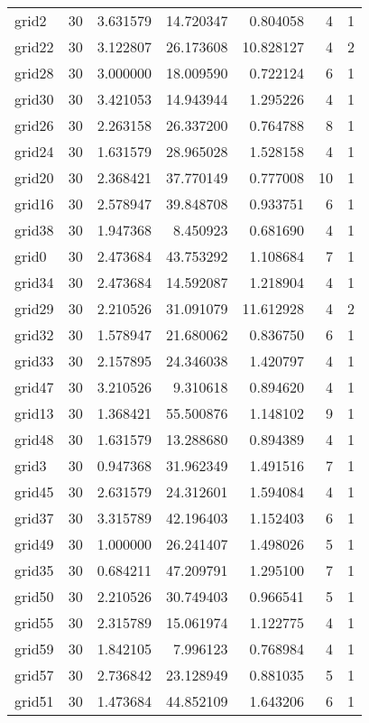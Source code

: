 \begin{longtable}{|l|r|r|r|r|r|r|}
grid2 & 30 & 3.631579 & 14.720347 & 0.804058 & 4 & 1 \\
grid22 & 30 & 3.122807 & 26.173608 & 10.828127 & 4 & 2 \\
grid28 & 30 & 3.000000 & 18.009590 & 0.722124 & 6 & 1 \\
grid30 & 30 & 3.421053 & 14.943944 & 1.295226 & 4 & 1 \\
grid26 & 30 & 2.263158 & 26.337200 & 0.764788 & 8 & 1 \\
grid24 & 30 & 1.631579 & 28.965028 & 1.528158 & 4 & 1 \\
grid20 & 30 & 2.368421 & 37.770149 & 0.777008 & 10 & 1 \\
grid16 & 30 & 2.578947 & 39.848708 & 0.933751 & 6 & 1 \\
grid38 & 30 & 1.947368 & 8.450923 & 0.681690 & 4 & 1 \\
grid0 & 30 & 2.473684 & 43.753292 & 1.108684 & 7 & 1 \\
grid34 & 30 & 2.473684 & 14.592087 & 1.218904 & 4 & 1 \\
grid29 & 30 & 2.210526 & 31.091079 & 11.612928 & 4 & 2 \\
grid32 & 30 & 1.578947 & 21.680062 & 0.836750 & 6 & 1 \\
grid33 & 30 & 2.157895 & 24.346038 & 1.420797 & 4 & 1 \\
grid47 & 30 & 3.210526 & 9.310618 & 0.894620 & 4 & 1 \\
grid13 & 30 & 1.368421 & 55.500876 & 1.148102 & 9 & 1 \\
grid48 & 30 & 1.631579 & 13.288680 & 0.894389 & 4 & 1 \\
grid3 & 30 & 0.947368 & 31.962349 & 1.491516 & 7 & 1 \\
grid45 & 30 & 2.631579 & 24.312601 & 1.594084 & 4 & 1 \\
grid37 & 30 & 3.315789 & 42.196403 & 1.152403 & 6 & 1 \\
grid49 & 30 & 1.000000 & 26.241407 & 1.498026 & 5 & 1 \\
grid35 & 30 & 0.684211 & 47.209791 & 1.295100 & 7 & 1 \\
grid50 & 30 & 2.210526 & 30.749403 & 0.966541 & 5 & 1 \\
grid55 & 30 & 2.315789 & 15.061974 & 1.122775 & 4 & 1 \\
grid59 & 30 & 1.842105 & 7.996123 & 0.768984 & 4 & 1 \\
grid57 & 30 & 2.736842 & 23.128949 & 0.881035 & 5 & 1 \\
grid51 & 30 & 1.473684 & 44.852109 & 1.643206 & 6 & 1 \\

\end{longtable}
